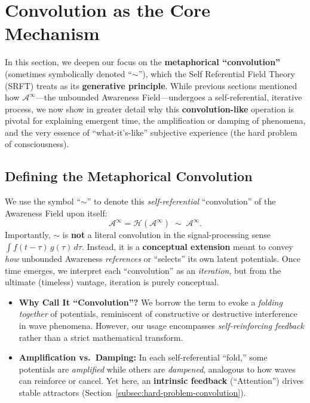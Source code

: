 \documentclass[12pt,a4paper]{article}
\begin{document}
\section{Convolution as the Core Mechanism}
\label{sec:convolution-core}

In this section, we deepen our focus on the \textbf{metaphorical ``convolution''} (sometimes symbolically 
denoted ``\(\sim\)''), which the Self Referential Field Theory (SRFT) treats as its \textbf{generative principle}. 
While previous sections mentioned how \(\mathscr{A}^\infty\)---the unbounded Awareness Field---undergoes 
a self-referential, iterative process, we now show in greater detail why this \textbf{convolution-like} 
operation is pivotal for explaining emergent time, the amplification or damping of phenomena, 
and the very essence of “what-it’s-like” subjective experience (the hard problem of consciousness).

\subsection{Defining the Metaphorical Convolution}
\label{subsec:convolution-definition}

We use the symbol ``\(\sim\)'' to denote this \emph{self-referential} “convolution” of the Awareness Field 
upon itself:
\[
  \mathscr{A}^\infty = \mathcal{H}(\mathscr{A}^\infty) \;\sim\; \mathscr{A}^\infty.
\]
Importantly, \(\sim\) is \textbf{not} a literal convolution in the signal-processing sense 
\(\int f(t-\tau)\,g(\tau)\,d\tau\). Instead, it is a \textbf{conceptual extension} meant to convey 
\emph{how} unbounded Awareness \emph{references} or “selects” its own latent potentials. Once time emerges, 
we interpret each “convolution” as an \emph{iteration}, but from the ultimate (timeless) vantage, 
iteration is purely conceptual.

\begin{itemize}
    \item \textbf{Why Call It ``Convolution''?} 
    We borrow the term to evoke a \emph{folding together} of potentials, 
    reminiscent of constructive or destructive interference in wave phenomena. 
    However, our usage encompasses \emph{self-reinforcing feedback} rather than 
    a strict mathematical transform.

    \item \textbf{Amplification vs.\ Damping:} 
    In each self-referential “fold,” some potentials are \emph{amplified} while others 
    are \emph{dampened}, analogous to how waves can reinforce or cancel. Yet here, an 
    \textbf{intrinsic feedback} (``Attention'') drives stable attractors 
    (Section~\ref{subsec:hard-problem-convolution}).
\end{itemize}
\end{document}
